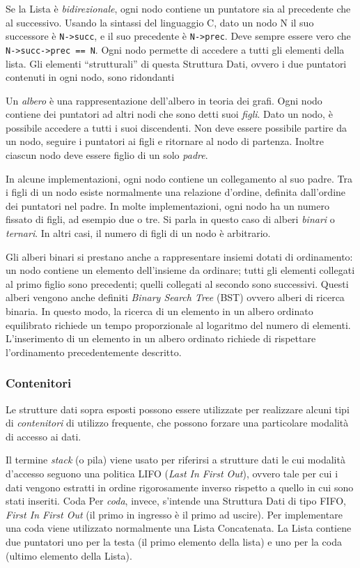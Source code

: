 Se   la Lista è \emph{bidirezionale}, ogni nodo contiene un puntatore sia al precedente che al successivo. Usando la sintassi del linguaggio C, dato un nodo N il suo successore è \lstinline!N->succ!, e il suo precedente è \lstinline!N->prec!. Deve sempre essere vero che \lstinline!N->succ->prec == N!. Ogni nodo permette di accedere a tutti gli elementi della lista. Gli elementi ``strutturali'' di questa Struttura Dati, ovvero i due puntatori contenuti in ogni nodo, sono ridondanti

Un  \emph{albero} è una rappresentazione dell'albero in teoria dei grafi. Ogni nodo contiene dei puntatori ad altri nodi che sono detti suoi \emph{figli}. Dato un nodo, è possibile accedere a tutti i suoi discendenti. Non deve essere possibile partire da un nodo, seguire i puntatori ai figli e ritornare al nodo di partenza. Inoltre ciascun nodo deve essere figlio di un solo \emph{padre}.

In alcune implementazioni, ogni nodo contiene un collegamento al suo padre. Tra i figli di un nodo esiste normalmente una relazione d'ordine, definita dall'ordine dei puntatori nel padre. In molte implementazioni, ogni nodo ha un numero fissato di figli, ad esempio due o tre. Si parla in questo caso di alberi \emph{binari} o \emph{ternari}. In altri casi, il numero di figli di un nodo è arbitrario.

Gli  alberi binari si prestano anche a rappresentare insiemi dotati di ordinamento: un nodo contiene un elemento dell'insieme da ordinare; tutti gli elementi collegati al primo figlio sono precedenti; quelli collegati al secondo sono successivi. Questi   alberi vengono anche definiti \emph{Binary Search Tree} (BST) ovvero alberi di ricerca binaria.
In questo modo, la ricerca di un elemento in un albero ordinato equilibrato richiede un tempo proporzionale al logaritmo del numero di elementi. L'inserimento di un elemento in un albero ordinato richiede di rispettare l'ordinamento precedentemente descritto.

		\subsubsection{Contenitori}
Le strutture dati sopra esposti possono essere utilizzate per realizzare alcuni tipi di \emph{contenitori} di utilizzo frequente, che possono forzare una particolare modalità di accesso ai dati.
	
Il  termine \emph{stack} (o pila) viene usato per riferirsi a strutture dati le cui modalità d'accesso seguono una politica LIFO (\emph{Last In First Out}), ovvero tale per cui i dati vengono estratti in ordine rigorosamente inverso rispetto a quello in cui sono stati inseriti. 
	Coda
Per  \emph{coda}, invece, s'intende una Struttura Dati di tipo FIFO, \emph{First In First Out} (il primo in ingresso è il primo ad uscire). Per implementare una coda viene utilizzato normalmente una Lista Concatenata. La Lista contiene due puntatori uno per la testa (il primo elemento della lista) e uno per la coda (ultimo elemento della Lista).